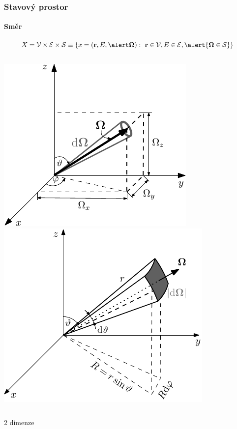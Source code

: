 \begin{frame}[t]
  \frametitle{Stavový prostor}
  \framesubtitle{Směr}
 
  $$
    X = \VV \times \EE \times \SS \equiv \{x = (\br,E,\alert\bomega):\ \br\in \VV, E \in \EE, \alert{\bomega\in \SS}\}
  $$
  
  
  \vspace{.5em}
  \begin{columns}
  \centering\includegraphics[width=.9\textwidth]{obr/cartesian_streaming}
  \centering\includegraphics[width=.9\textwidth]{obr/element}
  \end{columns}
  \begin{center}
  \alert{2 dimenze}
  \end{center}
  
\end{frame}


